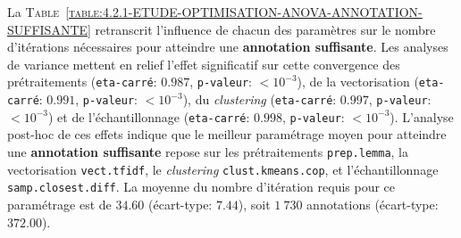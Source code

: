 			La \textsc{Table~\ref{table:4.2.1-ETUDE-OPTIMISATION-ANOVA-ANNOTATION-SUFFISANTE}} retranscrit l'influence de chacun des paramètres sur le nombre d'itérations nécessaires pour atteindre une \textbf{annotation suffisante}.
			Les analyses de variance mettent en relief l'effet significatif sur cette convergence des prétraitements (\texttt{eta-carré}: $0.987$, \texttt{p-valeur}: $< 10^{-3}$), de la vectorisation (\texttt{eta-carré}: $0.991$, \texttt{p-valeur}: $< 10^{-3}$), du \textit{clustering} (\texttt{eta-carré}: $0.997$, \texttt{p-valeur}: $< 10^{-3}$) et de l'échantillonnage (\texttt{eta-carré}: $0.998$, \texttt{p-valeur}: $< 10^{-3}$).
			L'analyse post-hoc de ces effets indique que le meilleur paramétrage moyen pour atteindre une \textbf{annotation suffisante} repose sur les prétraitements \texttt{prep.lemma}, la vectorisation \texttt{vect.tfidf}, le \textit{clustering} \texttt{clust.kmeans.cop}, et l'échantillonnage \texttt{samp.closest.diff}.
			La moyenne du nombre d'itération requis pour ce paramétrage est de $34.60$ (écart-type: $7.44$), soit $1~730$ annotations (écart-type: $372.00$).
